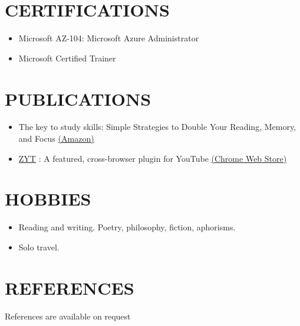 \documentclass[margin, 10pt]{res} %
\begin{document}
\begin{resume}
\section{\ttfamily CERTIFICATIONS}
\begin{itemize}
\item Microsoft AZ-104: Microsoft Azure Administrator 
\item Microsoft Certified Trainer
\end{itemize}
\section{\ttfamily PUBLICATIONS}
\begin{itemize}
\item The key to study skills: Simple Strategies to Double Your Reading, Memory, and Focus \hfill \href{https://amzn.to/3myBJlJ}{(Amazon)}
\item \href{https://github.com/inversepolarity/ZYT}{ZYT} : A featured, cross-browser plugin for YouTube \hfill 
\href{https://chrome.google.com/webstore/detail/zentube/ghfgfebinnjlnbidclplakjfielgpokd}{(Chrome Web Store)}
\
\end{itemize}
\section{\ttfamily HOBBIES}
\begin{itemize}
\item Reading and writing. Poetry, philosophy, fiction, aphorisms. 
\item Solo travel.
\end{itemize}
\section{\ttfamily REFERENCES}
References are available on request


\end{resume}
\end{document}
